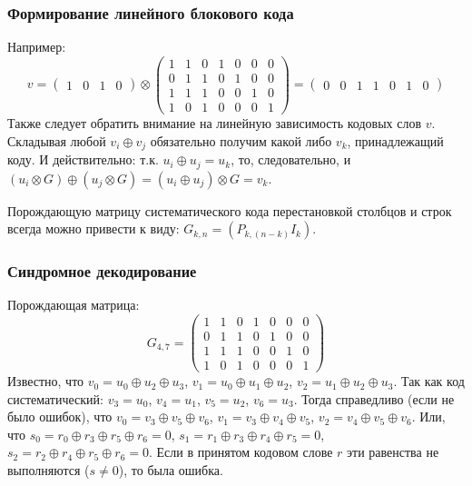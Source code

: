 \begin{frame}
    \frametitle{Формирование линейного блокового кода}
    
    Например:
    \[
        v=
        \begin{pmatrix}1&0&1&0\end{pmatrix}
        \otimes
        \begin{pmatrix}
            1&1&0&1&0&0&0\\
            0&1&1&0&1&0&0\\
            1&1&1&0&0&1&0\\
            1&0&1&0&0&0&1
        \end{pmatrix}
        =
        \begin{pmatrix}0&0&1&1&0&1&0\end{pmatrix}
    \]
    Также следует обратить внимание на \alert{линейную зависимость} кодовых слов $v$. Складывая любой $v_i\oplus v_j$ обязательно получим какой либо $v_k$, принадлежащий коду. И действительно: т.к. $u_i\oplus u_j=u_k$, то, следовательно, и $(u_i\otimes G)\oplus(u_j\otimes G) = (u_i\oplus u_j)\otimes G = v_k$.
    
    Порождающую матрицу \alert{систематического} кода перестановкой столбцов и строк всегда можно привести к виду: $G_{k,n} = (P_{k,(n-k)} I_k)$.    
\end{frame}


\begin{frame}
    \frametitle{Синдромное декодирование}
    
    Порождающая матрица:
    \[
        G_{4,7} = 
            \begin{pmatrix}
                1&1&0&1&0&0&0\\
                0&1&1&0&1&0&0\\
                1&1&1&0&0&1&0\\
                1&0&1&0&0&0&1
            \end{pmatrix}
    \]
    Известно, что $v_0=u_0\oplus u_2\oplus u_3$, $v_1=u_0\oplus u_1\oplus u_2$, $v_2=u_1\oplus u_2\oplus u_3$. Так как код \alert{систематический}: $v_3=u_0$, $v_4=u_1$, $v_5=u_2$, $v_6=u_3$. Тогда справедливо (если не было ошибок), что  $v_0=v_3\oplus v_5\oplus v_6$, $v_1=v_3\oplus v_4\oplus v_5$, $v_2=v_4\oplus v_5\oplus v_6$. Или, что $s_0=r_0\oplus r_3\oplus r_5\oplus r_6=0$, $s_1=r_1\oplus r_3\oplus r_4\oplus r_5=0$, $s_2=r_2\oplus r_4\oplus r_5\oplus r_6=0$. Если в принятом кодовом слове $r$ эти равенства не выполняются ($s\neq 0$), то была ошибка.
\end{frame}


